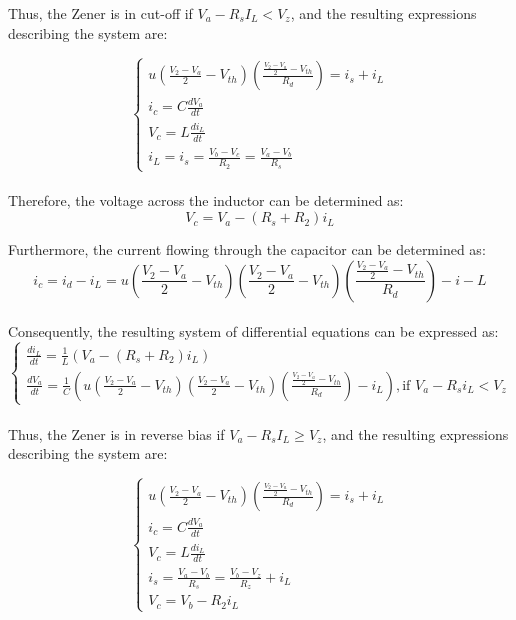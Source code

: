 Thus, the Zener is in cut-off if $V_a - R_sI_L < V_z$, and the resulting expressions describing the system are:

\begin{equation}
    \begin{cases}
        u(\frac{V_2-V_a}{2}-V_{th})(\frac{\frac{V_2-V_a}{2}-V_{th}}{R_d})=i_s+i_L\\
        i_c=C\frac{dV_a}{dt}\\
        V_c=L\frac{di_L}{dt}\\
        i_L=i_s=\frac{V_b-V_c}{R_2}=\frac{V_a-V_b}{R_s}
    \end{cases}
\end{equation}\\

Therefore, the voltage across the inductor can be determined as:\\

\begin{equation}
    V_c=V_a-(R_s+R_2)i_L
\end{equation}

Furthermore, the current flowing through the capacitor can be determined as:\\

\begin{equation}
    i_c=i_d-i_L=u(\frac{V_2-V_a}{2}-V_{th})(\frac{V_2-V_a}{2}-V_{th})(\frac{\frac{V_2-V_a}{2}-V_{th}}{R_d})-i-L
\end{equation}\\

Consequently, the resulting system of differential equations can be expressed as:\\

\begin{equation}
    \begin{cases}
        \frac{di_L}{dt}=\frac{1}{L}(V_a-(R_s+R_2)i_L)\\
        \frac{dV_a}{dt}=\frac{1}{C}\left(u\left(\frac{V_2-V_a}{2}-V_{th}\right)\left(\frac{V_2-V_a}{2}-V_{th}\right)\left(\frac{\frac{V_2-V_a}{2}-V_{th}}{R_d}\right)-i_L\right), \text{if } V_a-R_si_L<V_z
    \end{cases}
\end{equation}\\

Thus, the Zener is in reverse bias if $V_a - R_sI_L \geq V_z$, and the resulting expressions describing the system are:

\begin{equation}
    \begin{cases}
        u(\frac{V_2-V_a}{2}-V_{th})(\frac{\frac{V_2-V_a}{2}-V_{th}}{R_d})=i_s+i_L\\
        i_c=C\frac{dV_a}{dt}\\
        V_c=L\frac{di_L}{dt}\\
        i_s=\frac{V_a-V_b}{R_s}=\frac{V_b-V_z}{R_z}+i_L\\
        V_c=V_b-R_2i_L
    \end{cases}
\end{equation}\\

